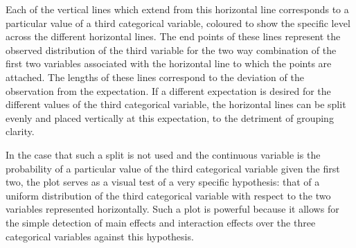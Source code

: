 Each of the vertical lines which extend from this horizontal line corresponds to a particular value of a third categorical
variable, coloured to show the specific level across the different horizontal lines. The end points of these lines represent the
observed distribution of the third variable for the two way
combination of the first two variables associated with the horizontal
line to which the points are attached. The lengths of these lines correspond to the deviation of the observation from the expectation. If a
different expectation is desired for the different values of the third categorical variable, the horizontal lines can be split
evenly and placed vertically at this expectation, to the detriment of grouping clarity.

In the case that such a split is not used and the continuous variable is the probability of a particular value of the third
categorical variable given the first two, the plot serves as a visual test of a very specific hypothesis: that of a uniform
distribution of the third categorical variable with respect to the two variables represented horizontally. Such a plot is powerful
because it allows for the simple detection of main effects and interaction effects over the three categorical variables against
this hypothesis.